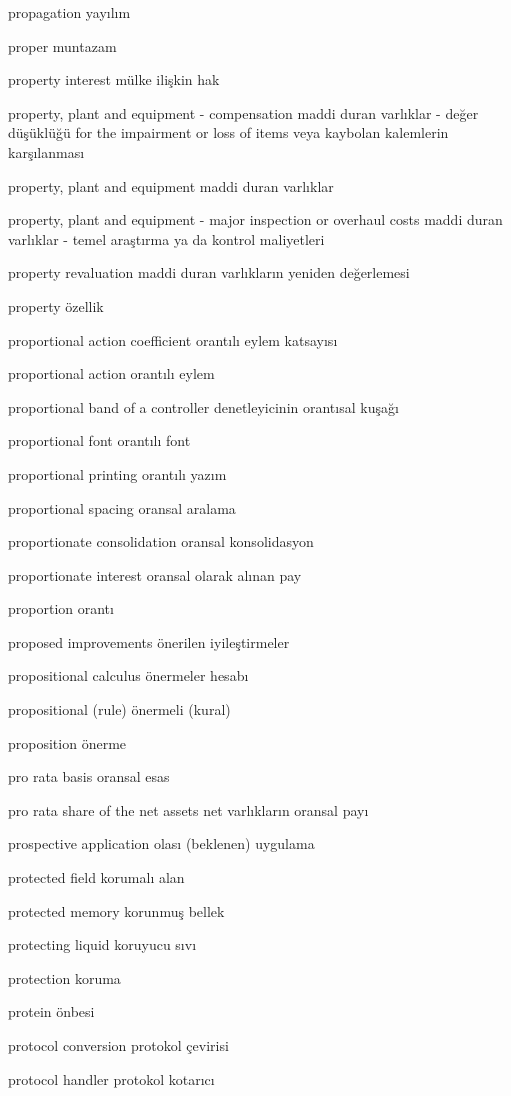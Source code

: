 \documentclass[12pt,fleqn]{article}\usepackage{../../common}
\begin{document}
propagation yayılım

proper muntazam

property interest mülke ilişkin hak

property, plant and equipment - compensation maddi duran varlıklar - değer düşüklüğü for the impairment or loss of items veya kaybolan kalemlerin karşılanması

property, plant and equipment maddi duran varlıklar

property, plant and equipment - major inspection or overhaul costs maddi duran varlıklar - temel araştırma ya da kontrol maliyetleri

property revaluation maddi duran varlıkların yeniden değerlemesi

property özellik

proportional action coefficient orantılı eylem katsayısı

proportional action orantılı eylem

proportional band of a controller denetleyicinin orantısal kuşağı

proportional font orantılı font

proportional printing orantılı yazım

proportional spacing oransal aralama

proportionate consolidation oransal konsolidasyon

proportionate interest oransal olarak alınan pay

proportion orantı

proposed improvements önerilen iyileştirmeler

propositional calculus önermeler hesabı

propositional (rule) önermeli (kural)

proposition önerme

pro rata basis oransal esas

pro rata share of the net assets net varlıkların oransal payı

prospective application olası (beklenen) uygulama

protected field korumalı alan

protected memory korunmuş bellek

protecting liquid koruyucu sıvı

protection koruma

protein önbesi

protocol conversion protokol çevirisi

protocol handler protokol kotarıcı
\end{document}
